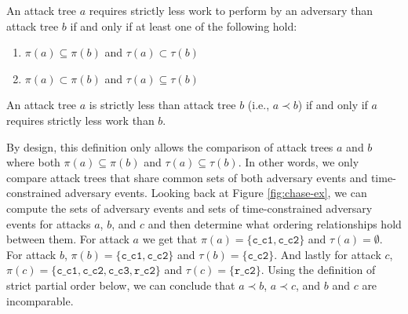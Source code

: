 \documentclass[runningheads]{llncs}
\theoremstyle{definition}
\newcommand{\squash}{\itemsep=0pt\parskip=0pt}
\begin{document}
\begin{definition}
  An attack tree $a$ requires strictly less work to perform by an adversary than attack tree $b$ if and only if at least one of the following hold: 
\begin{enumerate}
  \squash
  \item $\pi(a) \subseteq \pi(b)$ and $\tau(a) \subset \tau(b)$
  \item $\pi(a) \subset \pi(b)$ and $\tau(a) \subseteq \tau(b)$
\end{enumerate}
\end{definition}

\begin{definition}
  An attack tree $a$ is strictly less than attack tree $b$ (i.e., $a \prec b$) if and only if $a$ requires strictly less work than $b$.
\end{definition}

\noindent By design, this definition only allows the comparison of attack trees $a$ and $b$ where both $\pi(a) \subseteq \pi(b)$ and $\tau(a) \subseteq \tau(b)$. In other words, we only compare attack trees that share common sets of both adversary events and time-constrained adversary events. Looking back at Figure \ref{fig:chase-ex}, we can compute the sets of adversary events and sets of time-constrained adversary events for attacks $a$, $b$, and $c$ and then determine what ordering relationships hold between them. For attack $a$ we get that $\pi(a) = \{ \texttt{c\_c1}, \texttt{c\_c2} \}$ and $\tau(a) = \emptyset$. For attack $b$, $\pi(b) = \{ \texttt{c\_c1}, \texttt{c\_c2} \}$ and $\tau(b) = \{ \texttt{c\_c2} \}$. And lastly for attack $c$, $\pi(c) = \{ \texttt{c\_c1}, \texttt{c\_c2}, \texttt{c\_c3}, \texttt{r\_c2} \}$ and $\tau(c) = \{ \texttt{r\_c2} \}$. Using the definition of strict partial order below, we can conclude that $a \prec b$, $a \prec c$, and $b$ and $c$ are incomparable.
\end{document}
